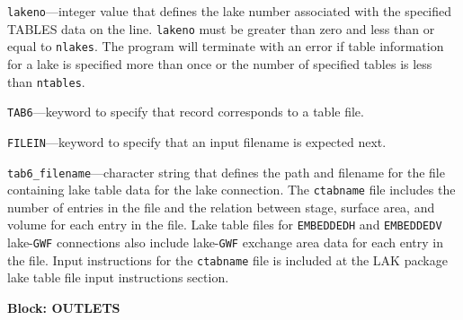 \begin{description}
\item \texttt{lakeno}---integer value that defines the lake number associated with the specified TABLES data on the line. \texttt{lakeno} must be greater than zero and less than or equal to \texttt{nlakes}. The program will terminate with an error if table information for a lake is specified more than once or the number of specified tables is less than \texttt{ntables}.

\item \texttt{TAB6}---keyword to specify that record corresponds to a table file.

\item \texttt{FILEIN}---keyword to specify that an input filename is expected next.

\item \texttt{tab6\_filename}---character string that defines the path and filename for the file containing lake table data for the lake connection. The \texttt{ctabname} file includes the number of entries in the file and the relation between stage, surface area, and volume for each entry in the file. Lake table files for \texttt{EMBEDDEDH} and \texttt{EMBEDDEDV} lake-\texttt{GWF} connections also include lake-\texttt{GWF} exchange area data for each entry in the file. Input instructions for the \texttt{ctabname} file is included at the LAK package lake table file input instructions section.

\end{description}
\item \textbf{Block: OUTLETS}

